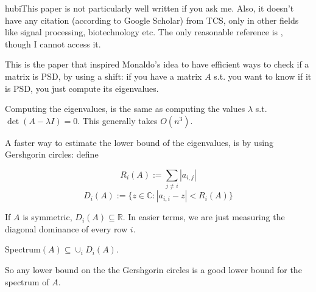 hubi{This paper is not particularly well written if you ask me. Also, it doesn't have any citation (according to Google Scholar) from TCS, only in other fields like signal processing, biotechnology etc. The only reasonable reference is \cite{schleif_practical_2024}, though I cannot access it.}

This is the paper that inspired Monaldo's idea to have efficient ways to check if a matrix is PSD, by using a shift: if you have a matrix $A$ s.t. you want to know if it is PSD, you just compute its eigenvalues. 

Computing the eigenvalues, is the same as computing the values $\lambda$ s.t. $\det(A - \lambda I) = 0$. This generally takes $O(n^3)$.

A faster way to estimate the lower bound of the eigenvalues, is by using Gershgorin circles: define 

\begin{equation}
	R_i(A) := \sum_{j\neq i} |a_{i,j}|
\end{equation}
\begin{equation}
	D_i(A) := \{z \in \mathbb{C} : |a_{i,i} - z| < R_i(A)\}
\end{equation}

If $A$ is symmetric, $D_i(A) \subseteq \mathbb{R}$. In easier terms, we are just measuring the diagonal dominance of every row $i$.

\begin{theorem}
\label{thm:gershgorin_circle}
	Spectrum$(A) \subseteq \cup_i D_i(A)$.
\end{theorem}

So any lower bound on the the Gershgorin circles is a good lower bound for the spectrum of $A$.




